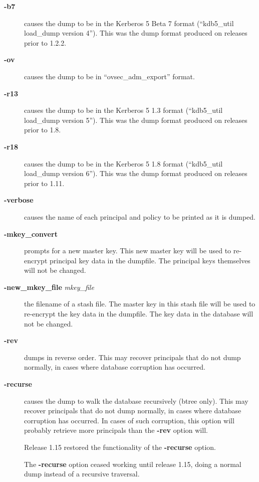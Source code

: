 \documentclass[letterpaper,10pt,english]{sphinxmanual}
\begin{document}
\begin{description}
\item[{\textbf{-b7}}] \leavevmode
causes the dump to be in the Kerberos 5 Beta 7 format (``kdb5\_util
load\_dump version 4'').  This was the dump format produced on
releases prior to 1.2.2.

\item[{\textbf{-ov}}] \leavevmode
causes the dump to be in ``ovsec\_adm\_export'' format.

\item[{\textbf{-r13}}] \leavevmode
causes the dump to be in the Kerberos 5 1.3 format (``kdb5\_util
load\_dump version 5'').  This was the dump format produced on
releases prior to 1.8.

\item[{\textbf{-r18}}] \leavevmode
causes the dump to be in the Kerberos 5 1.8 format (``kdb5\_util
load\_dump version 6'').  This was the dump format produced on
releases prior to 1.11.

\item[{\textbf{-verbose}}] \leavevmode
causes the name of each principal and policy to be printed as it
is dumped.

\item[{\textbf{-mkey\_convert}}] \leavevmode
prompts for a new master key.  This new master key will be used to
re-encrypt principal key data in the dumpfile.  The principal keys
themselves will not be changed.

\item[{\textbf{-new\_mkey\_file} \emph{mkey\_file}}] \leavevmode
the filename of a stash file.  The master key in this stash file
will be used to re-encrypt the key data in the dumpfile.  The key
data in the database will not be changed.

\item[{\textbf{-rev}}] \leavevmode
dumps in reverse order.  This may recover principals that do not
dump normally, in cases where database corruption has occurred.

\item[{\textbf{-recurse}}] \leavevmode
causes the dump to walk the database recursively (btree only).
This may recover principals that do not dump normally, in cases
where database corruption has occurred.  In cases of such
corruption, this option will probably retrieve more principals
than the \textbf{-rev} option will.

Release 1.15 restored the functionality of the \textbf{-recurse}
option.

The \textbf{-recurse} option ceased working until release 1.15,
doing a normal dump instead of a recursive traversal.

\end{description}
\end{document}
